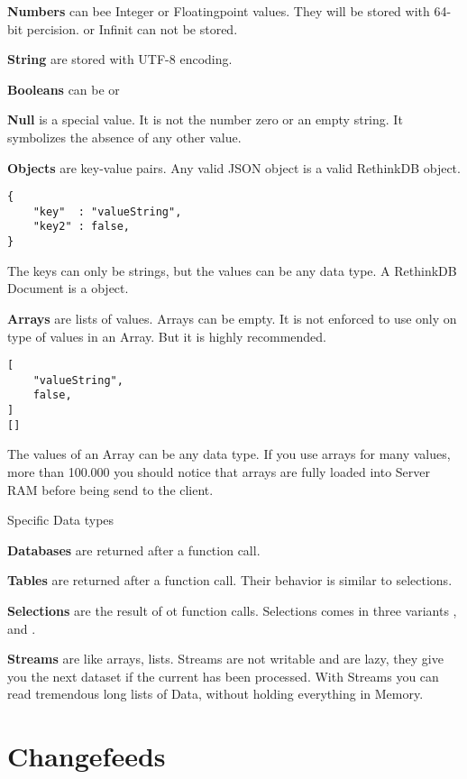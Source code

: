 \textbf{Numbers} can bee Integer or Floatingpoint values. 
They will be stored with 64-bit percision.
 or Infinit can not be stored.

\textbf{String} are stored with UTF-8 encoding.

\textbf{Booleans} can be  or 

\textbf{Null} is a special value.
It is not the number zero or an empty string.
It symbolizes the absence of any other value.

\textbf{Objects} are key-value pairs.
Any valid JSON object is a valid RethinkDB object.
\begin{lstlisting}[frame=single, caption=RethinkDB's object notation, label=refdoc]
{
	"key"  : "valueString",
	"key2" : false,
}
\end{lstlisting}
The keys can only be strings, but the values can be any data type.
A RethinkDB Document is a object.

\textbf{Arrays} are lists of values.
Arrays can be empty.
It is not enforced to use only on type of values in an Array.
But it is highly recommended.
\begin{lstlisting}[frame=single, caption=RethinkDB's array notation, label=refdoc]
[
	"valueString",
	false,
]
[]
\end{lstlisting}
The values of an Array can be any data type.
If you use arrays for many values, more than 100.000 you should notice that arrays are fully loaded into Server RAM before being send to the client.

Specific Data types

\textbf{Databases} are returned after a  function call.

\textbf{Tables} are returned after a  function call.
Their behavior is similar to selections.

\textbf{Selections} are the result of  ot  function calls.
Selections comes in three variants ,  and .

\textbf{Streams} are like arrays, lists.
Streams are not writable and are lazy, they give you the next dataset if the current has been processed.
With Streams you can read tremendous long lists of Data, without holding everything in Memory.


\section{Changefeeds}


